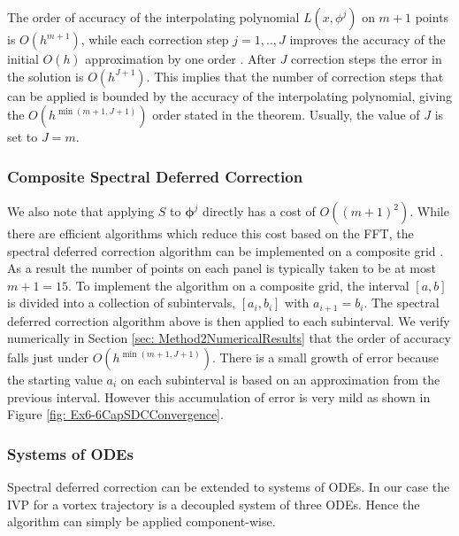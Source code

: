 \documentclass{sfuthesis}
\begin{document}
The order of accuracy of the interpolating polynomial $L(x,\phi^j)$ on $m+1$ points is $O(h^{m+1})$, while each correction step $j=1,..,J$ improves the accuracy of the initial $O(h)$ approximation by one order \cite{Lev2007}. After $J$ correction steps the error in the solution is $O(h^{J+1})$. This implies that the number of correction steps that can be applied is bounded by the accuracy of the interpolating polynomial, giving the $O(h^{\min(m+1,J+1)})$ order stated in the theorem. Usually, the value of $J$ is set to $J=m$. 


\subsubsection{Composite Spectral Deferred Correction}
We also note that applying $S$ to $\bm{\phi}^j$ directly has a cost of $O({(m+1)}^2)$.  While there are efficient algorithms which reduce this cost based on the FFT, the spectral deferred correction algorithm can be implemented on a composite grid \cite{Dutt2000}. As a result the number of points on each panel is typically taken to be at most $m+1=15$. To implement the algorithm on a composite grid, the interval $[a,b]$ is divided into a collection of subintervals, $[a_i, b_i]$ with $a_{i+1}=b_i$. The spectral deferred correction algorithm above is then applied to each subinterval. We verify numerically in Section \ref{sec: Method2NumericalResults} that the order of accuracy falls just under $O(h^{\min(m+1, J+1)})$. There is a small growth of error because the starting value $a_i$ on each subinterval is based on an approximation from the previous interval. However this accumulation of error is very mild as shown in Figure \ref{fig: Ex6-6CapSDCConvergence}.


\subsubsection{Systems of ODEs}
Spectral deferred correction can be extended to systems of ODEs. In our case the IVP for a vortex trajectory is a decoupled system of three ODEs. Hence the algorithm can simply be applied component-wise. 
\end{document}
